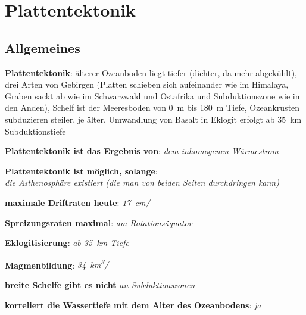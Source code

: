 \chapter{%
    Plattentektonik%
}

\section{%
    Allgemeines%
}

\textbf{Plattentektonik}:
älterer Ozeanboden liegt tiefer (dichter, da mehr abgekühlt),
drei Arten von Gebirgen
(Platten schieben sich aufeinander wie im Himalaya,
Graben sackt ab wie im Schwarzwald und Ostafrika und
Subduktionszone wie in den Anden),
Schelf ist der Meeresboden von \SI{0}{\meter} bis \SI{180}{\meter} Tiefe,
Ozeankrusten subduzieren steiler, je älter,
Umwandlung von Basalt in Eklogit erfolgt ab \SI{35}{\kilo\meter} Subduktionstiefe

\begin{wichtig}
    \item
    \textbf{Plattentektonik ist das Ergebnis von}:
    \emph{dem inhomogenen Wärmestrom}

    \item
    \textbf{Plattentektonik ist möglich, solange}:\\
    \emph{die Asthenosphäre existiert (die man von beiden Seiten durchdringen kann)}

    \item
    \textbf{maximale Driftraten heute}:
    \emph{\SI[math-rm=\mathit,text-rm=\itshape]{17}{\centi\meter/\year}}

    \item
    \textbf{Spreizungsraten maximal}:
    \emph{am Rotationsäquator}

    \item
    \textbf{Eklogitisierung}:
    \emph{ab \SI[math-rm=\mathit,text-rm=\itshape]{35}{\kilo\meter} Tiefe}

    \item
    \textbf{Magmenbildung}:
    \emph{\SI[math-rm=\mathit,text-rm=\itshape]{34}{\kilo\meter^3/\year}}

    \item
    \textbf{breite Schelfe gibt es nicht}
    \emph{an Subduktionszonen}

    \item
    \textbf{korreliert die Wassertiefe mit dem Alter des Ozeanbodens}:
    \emph{ja}
\end{wichtig}

